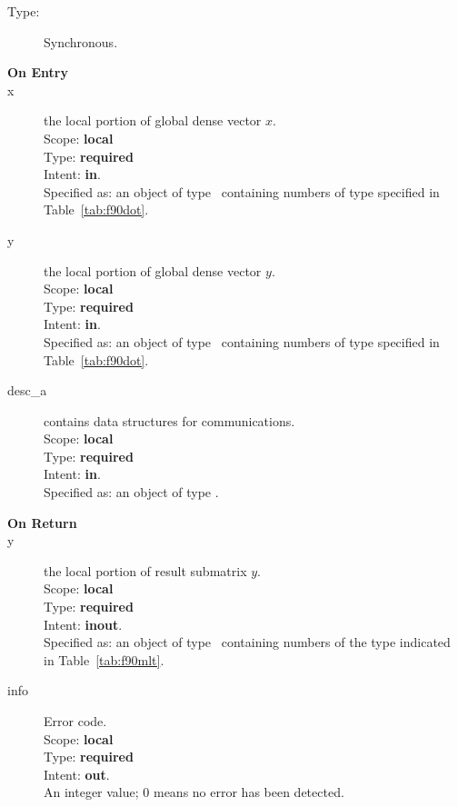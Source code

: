 \begin{description}
	\item[Type:] Synchronous.
	\item[\bf On Entry]
	\item[x] the local portion of global dense vector
	$x$.\\
	Scope: {\bf local} \\
	Type: {\bf required} \\
	Intent: {\bf in}.\\
	Specified as:  an object of type \vdata\ 
	containing numbers of type specified in
	Table~\ref{tab:f90dot}.
	\item[y] the local portion of global dense vector
	$y$. \\
	Scope: {\bf local} \\
	Type: {\bf required} \\
	Intent: {\bf in}.\\
	Specified as:  an object of type \vdata\ 
	containing numbers of type specified in
	Table~\ref{tab:f90dot}.
	\item[desc\_a] contains data structures for communications.\\
	Scope: {\bf local} \\
	Type: {\bf required}\\
	Intent: {\bf in}.\\
	Specified as: an object of type \descdata.
	\item[\bf On Return] 
	\item[y] the local portion of result submatrix $y$.\\
	Scope: {\bf local} \\
	Type: {\bf required} \\
	Intent: {\bf inout}.\\
	Specified as: an object of type \vdata\ containing numbers of the type
	indicated in Table~\ref{tab:f90mlt}.
	\item[info] Error code.\\
	Scope: {\bf local} \\
	Type: {\bf required} \\
	Intent: {\bf out}.\\
	An integer value; 0 means no error has been detected. 
\end{description}

